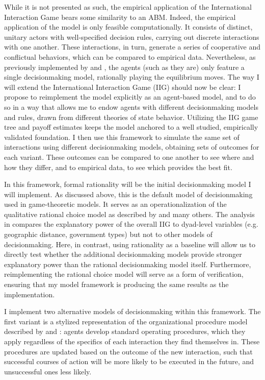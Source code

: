 While it is not presented as such, the \citet{bdm_1992} empirical application of the International Interaction Game bears some similarity to an ABM. Indeed, the empirical application of the model is only feasible computationally. It consists of distinct, unitary actors with well-specified decision rules, carrying out discrete interactions with one another. These interactions, in turn, generate a series of cooperative and conflictual behaviors, which can be compared to empirical data. Nevertheless, as previously implemented by \citet{bdm_1992} and \citet{bennett_2000,bennett_2000b}, the agents (such as they are) only feature a single decisionmaking model, rationally playing the equilibrium moves. The way I will extend the International Interaction Game (IIG) should now be clear: I propose to reimplement the model explicitly as an agent-based model, and to do so in a way that allows me to endow agents with  different decisionmaking models and rules, drawn from different theories of state behavior. Utilizing the IIG game tree and payoff estimates keeps the model anchored to a well studied, empirically validated foundation. I then use this framework to simulate the same set of interactions using different decisionmaking models, obtaining sets of outcomes for each variant. These outcomes can be compared to one another to see where and how they differ, and to empirical data, to see which provides the best fit.


In this framework, formal rationality will be the initial decisionmaking model I will implement. As discussed above, this is the default model of decisionmaking used in game-theoretic models. It serves as an operationalization of the qualitative rational choice model as described by \citet{allison_1999} and many others. The analysis in \citet{bennett_2000} compares the explanatory power of the overall IIG to dyad-level variables (e.g. geographic distance, government types) but not to other models of decisionmaking. Here, in contrast, using rationality as a baseline will allow us to directly test whether the additional decisionmaking models provide stronger explanatory power than the rational decisionmaking model itself. Furthermore, reimplementing the rational choice model will serve as a form of verification, ensuring that my model framework is producing the same results as the \citet{bennett_2000,bennett_2000b} implementation.

I implement two alternative models of decisionmaking within this framework. The first variant is a stylized representation of the organizational procedure model described by \citet{allison_1999} and \citet{levy_1986}: agents develop standard operating procedures, which they apply regardless of the specifics of each interaction they find themselves in. These procedures are updated based on the outcome of the new interaction, such that successful courses of action will be more likely to be executed in the future, and unsuccessful ones less likely.


